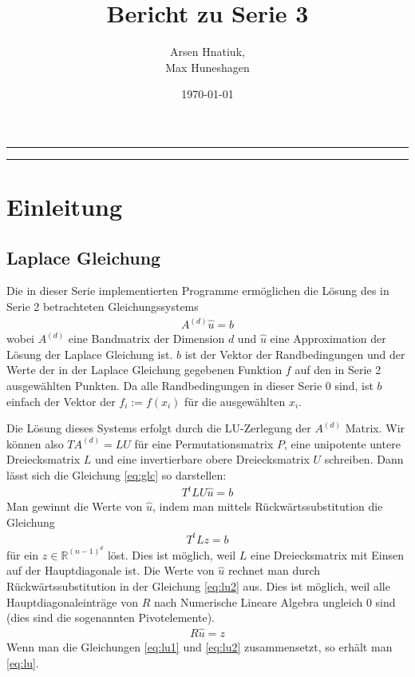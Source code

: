 \documentclass[smallheadings]{scrartcl}
\title{Bericht zu Serie 3}
\author{%
  Arsen Hnatiuk,\\%
  Max Huneshagen 
}
\date{\today}
\numberwithin{equation}{section}
\begin{document}
\maketitle
\tableofcontents
\bigskip

\hrule
\hrule


\section{Einleitung}

\subsection{Laplace Gleichung}
Die in dieser Serie implementierten Programme ermöglichen die Lösung des in Serie 2 betrachteten Gleichungssystems
\begin{align}
	A^{(d)}\hat{u} = b
	\label{eq:glc}
\end{align}
wobei $A^{(d)}$ eine Bandmatrix der Dimension $d$ und $\hat{u}$ eine Approximation der Lösung der Laplace Gleichung ist. $b$ ist der Vektor der Randbedingungen und der Werte der in der Laplace Gleichung gegebenen Funktion $f$ auf den in Serie 2 ausgewählten Punkten. Da alle Randbedingungen in dieser Serie $0$ sind, ist $b$ einfach der Vektor der $f_i := f(x_i)$ für die ausgewählten $x_i$. 

Die Lösung dieses Systems erfolgt durch die LU-Zerlegung der $A^{(d)}$ Matrix. Wir können also $TA^{(d)}=LU$ für eine Permutationsmatrix $P$, eine unipotente untere Dreiecksmatrix $L$ und eine invertierbare obere Dreiecksmatrix $U$ schreiben. Dann lässt sich die Gleichung \ref{eq:glc} so darstellen:
\begin{align}
	T^tLU\hat{u}=b
	\label{eq:lu}
\end{align}
Man gewinnt die Werte von $\hat{u}$, indem man mittels Rückwärtssubstitution die Gleichung 
\begin{align}
	T^tLz=b
	\label{eq:lu1}
\end{align}
für ein $z\in \mathbb{R}^{(n-1)^d}$ löst. Dies ist möglich, weil $L$ eine Dreiecksmatrix mit Einsen auf der Hauptdiagonale ist. Die Werte von $\hat{u}$ rechnet man durch Rückwärtssubstitution in der Gleichung \eqref{eq:lu2} aus. Dies ist möglich, weil alle Hauptdiagonaleinträge von $R$ nach Numerische Lineare Algebra ungleich $0$ sind (dies sind die sogenannten Pivotelemente).
\begin{align}
	R\hat{u}=z
	\label{eq:lu2}
\end{align}
Wenn man die Gleichungen \eqref{eq:lu1} und \eqref{eq:lu2} zusammensetzt, so erhält man \eqref{eq:lu}.
\end{document}
